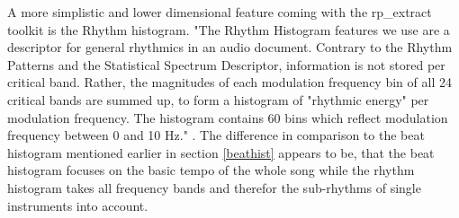 A more simplistic and lower dimensional feature coming with the rp\_extract toolkit is the Rhythm histogram. "The Rhythm Histogram features we use are a descriptor for general rhythmics in an audio document. Contrary to the Rhythm Patterns and the Statistical Spectrum Descriptor, information is not stored per critical band. Rather, the magnitudes of each modulation frequency bin of all 24 critical bands are summed up, to form a histogram of "rhythmic energy" per modulation frequency. The histogram contains 60 bins which reflect modulation frequency between 0 and 10 Hz." \cite[p. 3]{rp1}. 
The difference in comparison to the beat histogram mentioned earlier in section \ref{beathist} appears to be, that the beat histogram focuses on the basic tempo of the whole song while the rhythm histogram takes all frequency bands and therefor the sub-rhythms of single instruments into account. 

